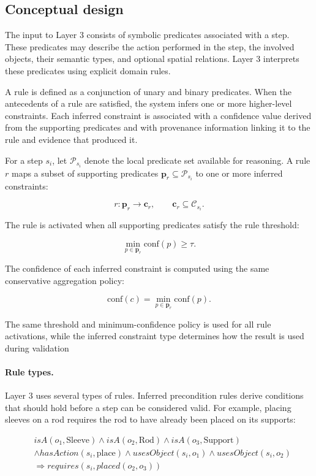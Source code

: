 \subsection{Conceptual design}

The input to Layer 3 consists of symbolic predicates associated with a step. These predicates may describe the action performed in the step, the involved objects, their semantic types, and optional spatial relations. Layer 3 interprets these predicates using explicit domain rules.

A rule is defined as a conjunction of unary and binary predicates. When the antecedents of a rule are satisfied, the system infers one or more higher-level constraints. Each inferred constraint is associated with a confidence value derived from the supporting predicates and with provenance information linking it to the rule and evidence that produced it.

For a step $s_i$, let $\mathcal{P}_{s_i}$ denote the local predicate set available for reasoning. A rule $r$ maps a subset of supporting predicates $\mathbf{p}_r \subseteq \mathcal{P}_{s_i}$ to one or more inferred constraints:

\[
r : \mathbf{p}_r \rightarrow \mathbf{c}_r,
\qquad
\mathbf{c}_r \subseteq \mathcal{C}_{s_i}.
\]

The rule is activated when all supporting predicates satisfy the rule threshold:

\[
\min_{p \in \mathbf{p}_r} \text{conf}(p) \geq \tau.
\]

The confidence of each inferred constraint is computed using the same conservative aggregation policy:

\[
\text{conf}(c) = \min_{p \in \mathbf{p}_r} \text{conf}(p).
\]

The same threshold and minimum-confidence policy is used for all rule activations, while the inferred constraint type determines how the result is used during validation

\paragraph{Rule types.}
Layer 3 uses several types of rules. Inferred precondition rules derive conditions that should hold before a step can be considered valid. For example, placing sleeves on a rod requires the rod to have already been placed on its supports:

\begin{align*}
&isA(o_1,\text{Sleeve}) \wedge isA(o_2,\text{Rod}) \wedge isA(o_3,\text{Support}) \\
&\wedge hasAction(s_i,\text{place}) \wedge usesObject(s_i,o_1) \wedge usesObject(s_i,o_2) \\
&\Rightarrow requires(s_i, placed(o_2,o_3)) 
\end{align*}

